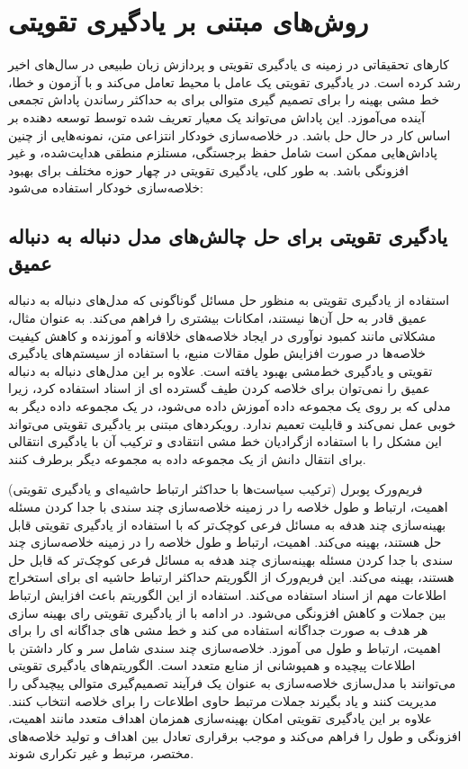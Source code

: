 \chapter{روش‌های مبتنی بر یادگیری تقویتی}

کارهای تحقیقاتی در زمینه ی یادگیری تقویتی
و پردازش زبان طبیعی در سال‌های اخیر رشد کرده است. در یادگیری تقویتی  یک عامل با محیط تعامل می‌کند و با آزمون و خطا، خط مشی بهینه را برای تصمیم گیری متوالی برای به حداکثر رساندن پاداش تجمعی آینده می‌آموزد. این پاداش می‌تواند یک معیار تعریف شده توسط توسعه دهنده بر اساس کار در حال حل باشد. در خلاصه‌سازی خودکار انتزاعی متن، نمونه‌هایی از چنین پاداش‌هایی ممکن است شامل حفظ برجستگی، مستلزم منطقی هدایت‌شده، و غیر افزونگی باشد. به طور کلی،  یادگیری تقویتی  در چهار حوزه مختلف برای بهبود خلاصه‌سازی خودکار استفاده می‌شود:

\section{ یادگیری تقویتی برای حل چالش‌های مدل دنباله به دنباله عمیق}

استفاده از یادگیری تقویتی به منظور حل مسائل گوناگونی که مدل‌های دنباله به دنباله عمیق قادر به حل آن‌ها نیستند، امکانات بیشتری را فراهم می‌کند. به عنوان مثال، مشکلاتی مانند کمبود نوآوری در ایجاد خلاصه‌های خلاقانه و آموزنده و کاهش کیفیت خلاصه‌ها در صورت افزایش طول مقالات منبع، با استفاده از سیستم‌های یادگیری تقویتی و یادگیری خط‌مشی بهبود یافته است.
 علاوه بر این  مدل‌های دنباله به دنباله عمیق را نمی‌توان برای خلاصه کردن طیف گسترده ای از اسناد استفاده کرد، زیرا مدلی که بر روی یک مجموعه داده آموزش داده می‌شود، در یک مجموعه داده دیگر به خوبی عمل نمی‌کند و قابلیت تعمیم ندارد. رویکردهای مبتنی بر یادگیری تقویتی می‌تواند این  مشکل را با استفاده ازگرادیان خط مشی انتقادی 
  و ترکیب آن با یادگیری انتقالی
برای انتقال دانش از یک مجموعه داده به مجموعه دیگر برطرف کنند\cite{DeepTL_RL}.

فریم‌ورک پوبرل
(ترکیب سیاست‌ها با حداکثر ارتباط حاشیه‌ای و یادگیری تقویتی) اهمیت، ارتباط و طول خلاصه را در زمینه خلاصه‌سازی چند سندی با جدا کردن مسئله بهینه‌سازی چند هدفه به مسائل فرعی کوچک‌تر که با استفاده از یادگیری تقویتی قابل حل هستند، بهینه می‌کند. 
اهمیت، ارتباط و طول خلاصه را در زمینه خلاصه‌سازی چند سندی با جدا کردن مسئله بهینه‌سازی چند هدفه به مسائل فرعی کوچک‌تر که قابل حل هستند، بهینه می‌کند.
این فریم‌ورک از الگوریتم حداکثر ارتباط حاشیه ای
برای استخراج اطلاعات مهم از اسناد استفاده می‌کند. استفاده از این الگوریتم باعث افزایش ارتباط بین  جملات و کاهش افزونگی می‌شود.
در ادامه با از یادگیری تقویتی رای بهینه سازی هر هدف به صورت جداگانه استفاده می کند و خط مشی های جداگانه ای را برای اهمیت، ارتباط و طول می آموزد\cite{PoBRL}.
خلاصه‌سازی چند سندی شامل سر و کار داشتن با اطلاعات پیچیده و همپوشانی از منابع متعدد است. الگوریتم‌های یادگیری تقویتی می‌توانند با مدل‌سازی خلاصه‌سازی به عنوان یک فرآیند تصمیم‌گیری متوالی  پیچیدگی را مدیریت کنند و یاد بگیرند جملات مرتبط حاوی اطلاعات را برای خلاصه انتخاب کنند. علاوه بر این  یادگیری تقویتی امکان بهینه‌سازی همزمان اهداف متعدد مانند اهمیت، افزونگی و طول را فراهم می‌کند و موجب برقراری تعادل بین اهداف و تولید خلاصه‌‌های مختصر، مرتبط و غیر تکراری شوند.

